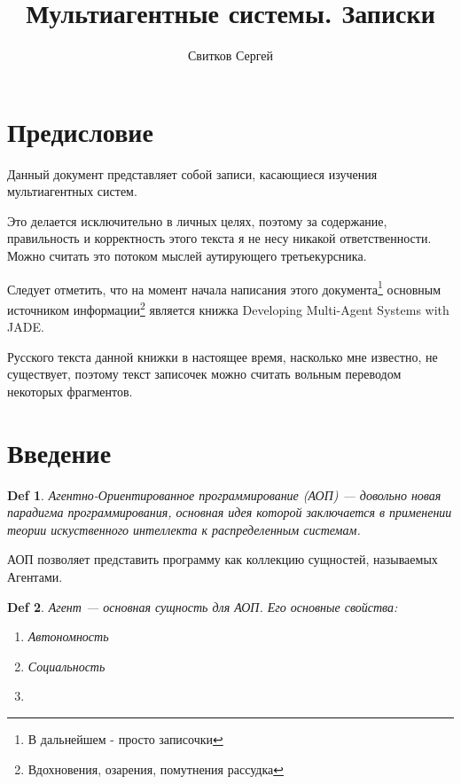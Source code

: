 \documentclass[12pt]{book}
\title{Мультиагентные системы. Записки}
\author{Свитков Сергей}
\newtheorem*{maindef}{Def}
\begin{document}
    \maketitle
    \tableofcontents
    \section *{Предисловие}
        Данный документ представляет собой записи, касающиеся изучения мультиагентных систем.
        
        Это делается исключительно в личных целях, поэтому за содержание, правильность и корректность этого текста я не несу никакой ответственности. Можно считать это потоком мыслей аутирующего третьекурсника.
        
        Следует отметить, что на момент начала написания этого документа\footnote{В дальнейшем - просто записочки} основным источником информации\footnote{Вдохновения, озарения, помутнения рассудка} является книжка Developing Multi-Agent Systems with JADE\cite{jade}.
        
        Русского текста данной книжки в настоящее время, насколько мне известно, не существует, поэтому текст записочек можно считать вольным переводом некоторых фрагментов.
        
        
    \section *{Введение}
        \begin{maindef}
            Агентно-Ориентированное программирование (АОП) --- довольно новая парадигма программирования, основная идея которой заключается в применении теории искуственного интеллекта к распределенным системам.
        \end{maindef}
        АОП позволяет представить программу как коллекцию сущностей, называемых Агентами.
        \begin{maindef}
            Агент --- основная сущность для АОП. Его основные свойства:
            \begin{enumerate}
                \item Автономность
                \item Социальность
                \item 
            \end{enumerate}
        \end{maindef}


        
\end{document}
